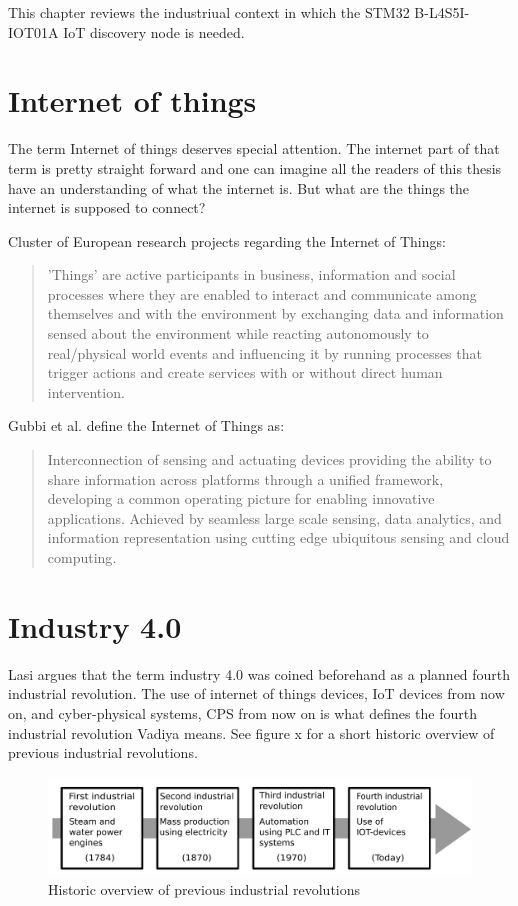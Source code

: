 This chapter reviews the industriual context in which the STM32 B-L4S5I-IOT01A IoT discovery node is needed.
\section{Internet of things}
The term Internet of things  deserves special attention. 
The internet part of that term is pretty straight forward and one can imagine all the readers of this thesis have an understanding of what the internet is.
But what are the things the internet is supposed to connect?

Cluster of European research projects regarding the Internet of Things:
\begin{quote}
    'Things' are active participants in business, information and social processes where they are enabled to interact and communicate among themselves and with the environment by exchanging data and information sensed about the environment while reacting autonomously to real/physical world events and influencing it by running processes that trigger actions and create services with or without direct human intervention\cite{Gubbi2013}.
\end{quote} 

Gubbi et al. define the Internet of Things as:
\begin{quote}
    Interconnection of sensing and actuating devices providing the ability to share information across platforms through a unified framework, developing a common operating picture for enabling innovative applications. 
    Achieved by seamless large scale sensing, data analytics, and information representation using cutting edge ubiquitous sensing and cloud computing\cite{Gubbi2013}.
\end{quote}


\section{Industry 4.0}
Lasi argues that the term industry 4.0 was coined beforehand as a planned fourth industrial revolution\cite{Lasi2014}.
The use of internet of things devices, IoT devices from now on, and cyber-physical systems, CPS from now on is what defines the fourth industrial revolution Vadiya means\cite{Vaidya2018}.
See figure x for a short historic overview of previous industrial revolutions.   
\begin{figure}
    \centering
    \includegraphics[width=\textwidth]{Pictures/Industrial_revolution.pdf} 
    \caption{Historic overview of previous industrial revolutions}
    \label{Indutrial revolutions}
\end{figure}

